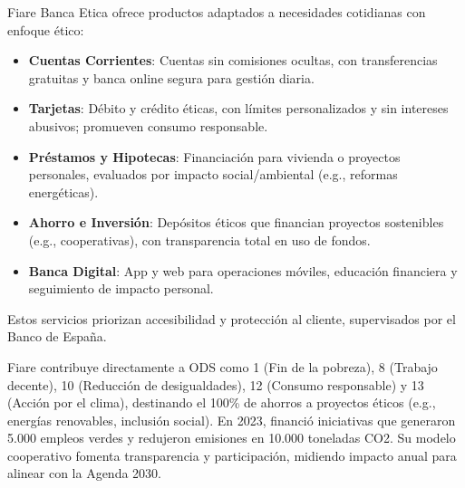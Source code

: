 Fiare Banca Etica ofrece productos adaptados a necesidades cotidianas con enfoque ético:
\begin{itemize}
\item \textbf{Cuentas Corrientes}: Cuentas sin comisiones ocultas, con transferencias gratuitas y banca online segura para gestión diaria.
\item \textbf{Tarjetas}: Débito y crédito éticas, con límites personalizados y sin intereses abusivos; promueven consumo responsable.
\item \textbf{Préstamos y Hipotecas}: Financiación para vivienda o proyectos personales, evaluados por impacto social/ambiental (e.g., reformas energéticas).
\item \textbf{Ahorro e Inversión}: Depósitos éticos que financian proyectos sostenibles (e.g., cooperativas), con transparencia total en uso de fondos.
\item \textbf{Banca Digital}: App y web para operaciones móviles, educación financiera y seguimiento de impacto personal.
\end{itemize}
Estos servicios priorizan accesibilidad y protección al cliente, supervisados por el Banco de España.

Fiare contribuye directamente a ODS como 1 (Fin de la pobreza), 8 (Trabajo decente), 10 (Reducción de desigualdades), 12 (Consumo responsable) y 13 (Acción por el clima), destinando el 100\% de ahorros a proyectos éticos (e.g., energías renovables, inclusión social). En 2023, financió iniciativas que generaron 5.000 empleos verdes y redujeron emisiones en 10.000 toneladas CO2. Su modelo cooperativo fomenta transparencia y participación, midiendo impacto anual para alinear con la Agenda 2030.






